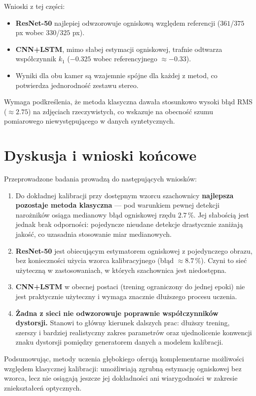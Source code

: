 \documentclass[12pt,a4paper]{report}
\begin{document}
Wnioski z tej części:
\begin{itemize}[leftmargin=*]
  \item \textbf{ResNet-50} najlepiej odwzorowuje ogniskową względem referencji
        ($361$/$375$ px wobec $330$/$325$ px).
  \item \textbf{CNN+LSTM}, mimo słabej estymacji ogniskowej, trafnie odtwarza współczynnik
        $k_1$ ($-0.325$ wobec referencyjnego $\approx -0.33$).
  \item Wyniki dla obu kamer są wzajemnie spójne dla każdej z metod, co potwierdza
        jednorodność zestawu stereo.
\end{itemize}
Wymaga podkreślenia, że metoda klasyczna dawała stosunkowo wysoki błąd RMS ($\approx 2.75$)
na zdjęciach rzeczywistych, co wskazuje na obecność szumu pomiarowego niewystępującego w
danych syntetycznych.

\section{Dyskusja i wnioski końcowe}
Przeprowadzone badania prowadzą do następujących wniosków:
\begin{enumerate}[leftmargin=*]
  \item Do dokładnej kalibracji przy dostępnym wzorcu szachownicy \textbf{najlepsza pozostaje
        metoda klasyczna} --- pod warunkiem pewnej detekcji narożników osiąga medianowy błąd
        ogniskowej rzędu $2.7\,\%$. Jej słabością jest jednak brak odporności: pojedyncze
        nieudane detekcje drastycznie zaniżają jakość, co uzasadnia stosowanie miar medianowych.
  \item \textbf{ResNet-50} jest obiecującym estymatorem ogniskowej z pojedynczego obrazu, bez
        konieczności użycia wzorca kalibracyjnego (błąd $\approx 8.7\,\%$). Czyni to sieć
        użyteczną w zastosowaniach, w których szachownica jest niedostępna.
  \item \textbf{CNN+LSTM} w obecnej postaci (trening ograniczony do jednej epoki) nie jest
        praktycznie użyteczny i wymaga znacznie dłuższego procesu uczenia.
  \item \textbf{Żadna z sieci nie odwzorowuje poprawnie współczynników dystorsji.} Stanowi to
        główny kierunek dalszych prac: dłuższy trening, szerszy i bardziej realistyczny zakres
        parametrów oraz ujednolicenie konwencji znaku dystorsji pomiędzy generatorem danych a
        modelem kalibracji.
\end{enumerate}
Podsumowując, metody uczenia głębokiego oferują komplementarne możliwości względem klasycznej
kalibracji: umożliwiają zgrubną estymację ogniskowej bez wzorca, lecz nie osiągają jeszcze jej
dokładności ani wiarygodności w zakresie zniekształceń optycznych.
\end{document}
